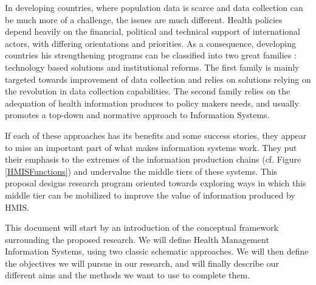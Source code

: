In developing countries, where population data is scarce and data collection can be much more of a challenge, the issues are much different. Health policies depend heavily on the financial, political and technical support of international actors, with differing orientations and priorities. As a consequence, developing countries \gls*{his} strengthening programs can be classified into two great families : technology based solutions and institutional reforms. The first family is mainly targeted towards improvement of data collection and relies on solutions relying on the revolution in  data collection capabilities. The second family relies on the adequation of health information produces to policy makers needs, and usually promotes a top-down and normative approach to Information Systems.

If each of these approaches has its benefits and some success stories,  they appear to miss an important part of what makes information systems work. They put their emphasis to the extremes of the information production chains (cf. Figure \ref{HMISFunctions}) and undervalue the middle tiers of these systems. This proposal designs research program oriented towards exploring ways in which this middle tier can be mobilized to improve the value of information produced by HMIS.

This document will start by an introduction of the conceptual framework surrounding the proposed research. We will define Health Management Information Systems, using two classic schematic approaches. We will then define the objectives we will pursue in our research, and will finally describe our different aims and the methods we want to use to complete them.




